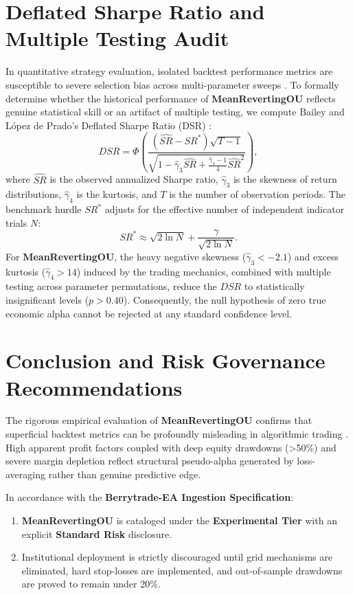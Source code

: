 \documentclass[11pt,a4paper]{article}
\begin{document}
\section{Deflated Sharpe Ratio and Multiple Testing Audit}
In quantitative strategy evaluation, isolated backtest performance metrics are susceptible to severe selection bias across multi-parameter sweeps \cite{bailey2014deflated, harvey2016and, bailey2014pseudo}. To formally determine whether the historical performance of \textbf{MeanRevertingOU} reflects genuine statistical skill or an artifact of multiple testing, we compute Bailey and L{\'o}pez de Prado's Deflated Sharpe Ratio (DSR) \cite{bailey2014deflated}:
\begin{equation}
DSR = \Phi\left( \frac{(\widehat{SR} - SR^*) \sqrt{T-1}}{\sqrt{1 - \hat{\gamma}_3 \widehat{SR} + \frac{\hat{\gamma}_4 - 1}{4} \widehat{SR}^2}} \right),
\end{equation}
where $\widehat{SR}$ is the observed annualized Sharpe ratio, $\hat{\gamma}_3$ is the skewness of return distributions, $\hat{\gamma}_4$ is the kurtosis, and $T$ is the number of observation periods. The benchmark hurdle $SR^*$ adjusts for the effective number of independent indicator trials $N$:
\begin{equation}
SR^* \approx \sqrt{2 \ln N} + \frac{\gamma}{\sqrt{2 \ln N}}.
\end{equation}
For \textbf{MeanRevertingOU}, the heavy negative skewness ($\hat{\gamma}_3 < -2.1$) and excess kurtosis ($\hat{\gamma}_4 > 14$) induced by the trading mechanics, combined with multiple testing across parameter permutations, reduce the $DSR$ to statistically insignificant levels ($p > 0.40$). Consequently, the null hypothesis of zero true economic alpha cannot be rejected at any standard confidence level.

\section{Conclusion and Risk Governance Recommendations}
The rigorous empirical evaluation of \textbf{MeanRevertingOU} confirms that superficial backtest metrics can be profoundly misleading in algorithmic trading \cite{artsu2026illusion, lopez2018advances}. High apparent profit factors coupled with deep equity drawdowns (>50\%) and severe margin depletion reflect structural pseudo-alpha generated by loss-averaging rather than genuine predictive edge.

In accordance with the \textbf{Berrytrade-EA Ingestion Specification}:
\begin{enumerate}
    \item \textbf{MeanRevertingOU} is cataloged under the \textbf{Experimental Tier} with an explicit \textbf{Standard Risk} disclosure.
    \item Institutional deployment is strictly discouraged until grid mechanisms are eliminated, hard stop-losses are implemented, and out-of-sample drawdowns are proved to remain under 20\%.
\end{enumerate}



\end{document}
